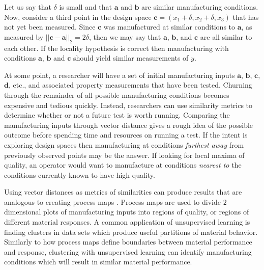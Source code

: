 Let us say that $\delta$ is small and that $\mathbf{a}$ and $\mathbf{b}$ are similar manufacturing conditions.
Now, consider a third point in the design space $\mathbf{c} = (x_{1} + \delta, x_2 + \delta, x_3)$ that has not yet been measured.
Since $\mathbf{c}$ was manufactured at similar conditions to $\mathbf{a}$, as measured by $||\mathbf{c} - \mathbf{a}||_2 = 2\delta$, then we may say that $\mathbf{a}$, $\mathbf{b}$, and $\mathbf{c}$ are all similar to each other. If the locality hypothesis is correct then manufacturing with conditions $\mathbf{a}$, $\mathbf{b}$ and $\mathbf{c}$ should yield similar measurements of $y$.

At some point, a researcher will have a set of initial manufacturing inputs $\mathbf{a}$, $\mathbf{b}$, $\mathbf{c}$, $\mathbf{d}$, etc., and associated property measurements that have been tested.
Churning through the remainder of all possible manufacturing conditions becomes expensive and tedious quickly.
Instead, researchers can use similarity metrics to determine whether or not a future test is worth running.
Comparing the manufacturing inputs through vector distance gives a rough idea of the possible outcome before spending time and resources on running a test.
If the intent is exploring design spaces then manufacturing at conditions \textit{furthest away} from previously observed points may be the answer.
If looking for local maxima of quality, an operator would want to manufacture at conditions \textit{nearest to} the conditions currently known to have high quality.

Using vector distances as metrics of similarities can produce results that are analogous to creating process maps \cite{Beuth2001}.
Process maps are used to divide $2$ dimensional plots of manufacturing inputs into regions of quality, or regions of different material responses. A common application of unsupervised learning is finding clusters in data sets which produce useful partitions of material behavior. Similarly to how process maps define boundaries between material performance and response, clustering with unsupervised learning can identify manufacturing conditions which will result in similar material performance.




